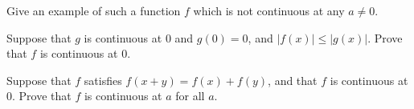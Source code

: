 \documentclass[12pt,letterpaper]{hmcpset}
\newcommand{\paren}[1]{\left(#1\right)}
\newcommand{\abs}[1]{\left|#1\right|}
\begin{document}
\begin{problem}
    Give an example of such a function $f$ which is not continuous at any $a \ne 0$.
\end{problem}

\begin{solution}

\end{solution}

\begin{problem}
    Suppose that $g$ is continuous at $0$ and $g\paren{0} = 0$, and $\abs{f\paren{x}} \le \abs{g\paren{x}}$. Prove that $f$ is continuous at 0.
\end{problem}

\begin{solution}

\end{solution}

\begin{problem}
    Suppose that $f$ satisfies $f\paren{x+y} = f\paren{x} + f\paren{y}$, and that $f$ is continuous at $0$. Prove that $f$ is continuous at $a$ for all $a$.    
\end{problem}

\begin{solution}

\end{solution}

\end{document}
